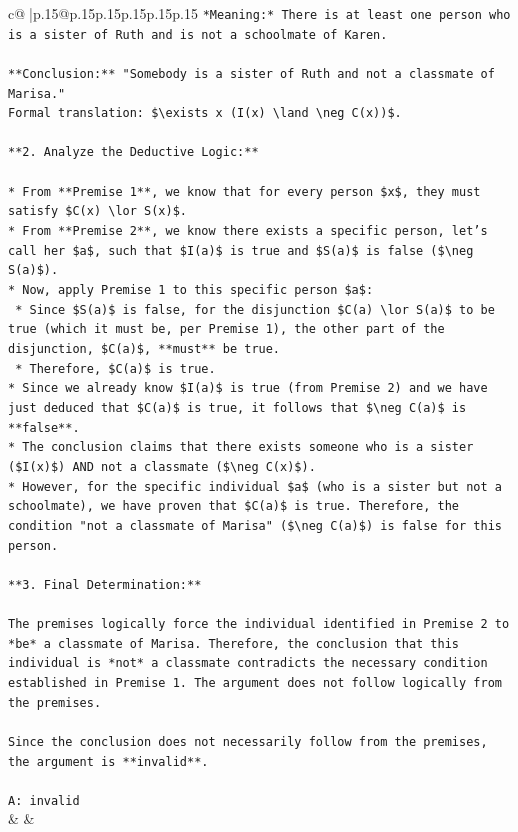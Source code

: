 \documentclass{article}
\begin{document}
{\begin{supertabular}{c@{$\;$}|p{.15\linewidth}@{}p{.15\linewidth}p{.15\linewidth}p{.15\linewidth}p{.15\linewidth}p{.15\linewidth}}
{{{\texttt{*Meaning:* There is at least one person who is a sister of Ruth and is not a schoolmate of Karen.} \\
\\ 
\texttt{**Conclusion:** "Somebody is a sister of Ruth and not a classmate of Marisa."} \\
\texttt{Formal translation: \$\textbackslash{}exists x (I(x) \textbackslash{}land \textbackslash{}neg C(x))\$.} \\
\\ 
\texttt{**2. Analyze the Deductive Logic:**} \\
\\ 
\texttt{*   From **Premise 1**, we know that for every person \$x\$, they must satisfy \$C(x) \textbackslash{}lor S(x)\$.} \\
\texttt{*   From **Premise 2**, we know there exists a specific person, let's call her \$a\$, such that \$I(a)\$ is true and \$S(a)\$ is false (\$\textbackslash{}neg S(a)\$).} \\
\texttt{*   Now, apply Premise 1 to this specific person \$a\$:} \\
\texttt{    *   Since \$S(a)\$ is false, for the disjunction \$C(a) \textbackslash{}lor S(a)\$ to be true (which it must be, per Premise 1), the other part of the disjunction, \$C(a)\$, **must** be true.} \\
\texttt{    *   Therefore, \$C(a)\$ is true.} \\
\texttt{*   Since we already know \$I(a)\$ is true (from Premise 2) and we have just deduced that \$C(a)\$ is true, it follows that \$\textbackslash{}neg C(a)\$ is **false**.} \\
\texttt{*   The conclusion claims that there exists someone who is a sister (\$I(x)\$) AND not a classmate (\$\textbackslash{}neg C(x)\$).} \\
\texttt{*   However, for the specific individual \$a\$ (who is a sister but not a schoolmate), we have proven that \$C(a)\$ is true. Therefore, the condition "not a classmate of Marisa" (\$\textbackslash{}neg C(a)\$) is false for this person.} \\
\\ 
\texttt{**3. Final Determination:**} \\
\\ 
\texttt{The premises logically force the individual identified in Premise 2 to *be* a classmate of Marisa. Therefore, the conclusion that this individual is *not* a classmate contradicts the necessary condition established in Premise 1. The argument does not follow logically from the premises.} \\
\\ 
\texttt{Since the conclusion does not necessarily follow from the premises, the argument is **invalid**.} \\
\\ 
\texttt{A: invalid} \\
            }
        }
    }
    & & \\ \\


\end{supertabular}}
\end{document}
